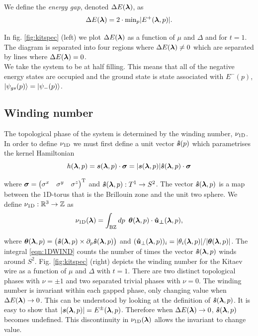 \noi We define the \emph{energy gap}, denoted $\Delta E(\boldsymbol{\lambda})$, as 
\begin{equation}
    \Delta E(\boldsymbol{\lambda})=2\cdot\text{min}_{p}|E^{+}(\boldsymbol{\lambda},p)|.
\end{equation}

\noi In fig. \ref{fig:kitspec} (left) we plot $\Delta E(\boldsymbol{\lambda})$ as a function of $\mu$ and $\Delta$ and for $t=1$. The diagram is separated into four regions where $\Delta E(\boldsymbol{\lambda})\neq0$ which are separated by lines where $\Delta E(\boldsymbol{\lambda})=0$.\\

We take the system to be at half filling. This means that all of the negative energy states are occupied and the ground state is state associated with $E^{-}(p)$, $\ket{\psi_{gs}(p)}=\ket{\psi_{-}(p)}$. 

\subsection{Winding number}

The topological phase of the system is determined by the winding number, $\nu_{\text{1D}}$. In order to define $\nu_{\text{1D}}$ we must first define a unit vector $\boldsymbol{\hat{s}}(p)$ which parametrises the kernel Hamiltonian
\begin{equation}
    h(\boldsymbol{\lambda},p) = \boldsymbol{s}(\boldsymbol{\lambda},p)\cdot\boldsymbol{\sigma}=|\boldsymbol{s}(\boldsymbol{\lambda},p)|\boldsymbol{\hat{s}}(\boldsymbol{\lambda},p)\cdot\boldsymbol{\sigma}
\end{equation}

\noi where $\boldsymbol{\sigma}=\begin{pmatrix} \sigma^{x} & \sigma^{y} & \sigma^{z} \end{pmatrix}^{\text{T}}$ and $\boldsymbol{\hat{s}}(\boldsymbol{\lambda},p):T^{1}\rightarrow S^{2}$. The vector $\boldsymbol{\hat{s}}(\boldsymbol{\lambda},p)$ is a map between the 1D-torus that is the Brillouin zone and the unit two sphere. We define $\nu_{\text{1D}}:\mathbb{R}^{3}\rightarrow \mathbb{Z}$ as 
\begin{equation}\label{eqn:1DWIND}
    \nu_{\text{1D}}(\boldsymbol{\lambda}) = \int_{\text{BZ}} dp \,\,\, \boldsymbol{\theta}(\boldsymbol{\lambda},p) \cdot\boldsymbol{\hat{u}_{\perp}}(\boldsymbol{\lambda},p),
\end{equation}

\noi where $\boldsymbol{\theta}(\boldsymbol{\lambda},p)=\big(\boldsymbol{\hat{s}}(\boldsymbol{\lambda},p)\times\partial_{p}\boldsymbol{\hat{s}}(\boldsymbol{\lambda},p)\big)$ and $(\boldsymbol{\hat{u}}_{\perp}(\boldsymbol{\lambda},p))_{i}=|\theta_{i}(\boldsymbol{\lambda},p)|/|\boldsymbol{\theta}(\boldsymbol{\lambda},p)|$. The integral \eqref{eqn:1DWIND} counts the number of times the vector $\boldsymbol{\hat{s}}(\boldsymbol{\lambda},p)$ winds around $S^{2}$. Fig. \ref{fig:kitspec} (right) depicts the winding number for the Kitaev wire as a function of $\mu$ and $\Delta$ with $t=1$. There are two distinct topological phases with $\nu=\pm1$ and two separated trivial phases with $\nu=0$. The winding number is invariant within each gapped phase, only changing value when $\Delta E(\boldsymbol{\lambda})\rightarrow0$. This can be understood by looking at the definition of $\boldsymbol{\hat{s}}(\boldsymbol{\lambda},p)$. It is easy to show that $|\boldsymbol{s}(\boldsymbol{\lambda},p)|=E^{\pm}(\boldsymbol{\lambda},p)$. Therefore when $\Delta E(\boldsymbol{\lambda})\rightarrow0$, $\boldsymbol{\hat{s}}(\boldsymbol{\lambda},p)$ becomes undefined. This discontinuity in $\nu_{\text{1D}}(\boldsymbol{\lambda})$ allows the invariant to change value.\\

